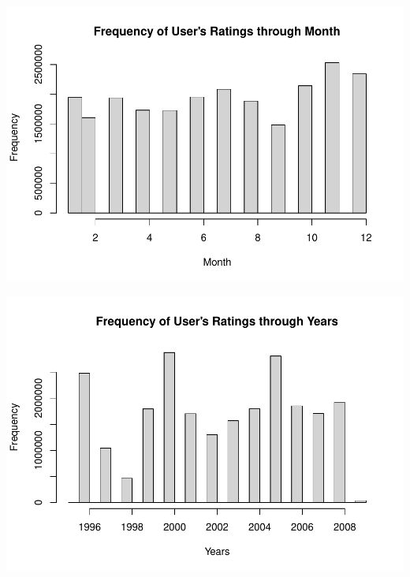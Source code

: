 \documentclass[
]{article}
\newenvironment{Shaded}{}{}
\newcommand{\AttributeTok}[1]{\textcolor[rgb]{0.49,0.56,0.16}{#1}}
\newcommand{\FunctionTok}[1]{\textcolor[rgb]{0.02,0.16,0.49}{#1}}
\newcommand{\NormalTok}[1]{#1}
\newcommand{\SpecialCharTok}[1]{\textcolor[rgb]{0.25,0.44,0.63}{#1}}
\newcommand{\StringTok}[1]{\textcolor[rgb]{0.25,0.44,0.63}{#1}}
\begin{document}
\begin{center}\includegraphics{MovieLens-Project-Code_files/figure-latex/unnamed-chunk-21-1} \end{center}

\begin{Shaded}
\end{Shaded}

\begin{center}\includegraphics{MovieLens-Project-Code_files/figure-latex/unnamed-chunk-21-2} \end{center}
\end{document}
